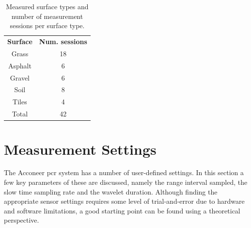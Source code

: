 \begin{table}
\begin{center}
	\begin{tabular}{|c|c|}
		\hline
		\rowcolor{gray!150}\color{white}\textbf{Surface} & \color{white}\textbf{Num. sessions} \\
		 Grass & 18 \\
		 \rowcolor{gray!25} Asphalt & 6 \\
		 Gravel & 6 \\
		 \rowcolor{gray!25} Soil & 8 \\
		 Tiles & 4 \\ \hline
		 \rowcolor{gray!25} Total & 42 \\
		 \hline
	\end{tabular}
\end{center}
\caption{Measured surface types and number of measurement sessions per surface type.}
\label{tab:count}
\end{table}

\section{Measurement Settings}

The Acconeer \gls{pcr} system has a number of user-defined settings. In this section a few key parameters of these are discussed, namely the range interval sampled, the slow time sampling rate and the wavelet duration. Although finding the appropriate sensor settings requires some level of trial-and-error due to hardware and software limitations, a good starting point can be found using a theoretical perspective. 

